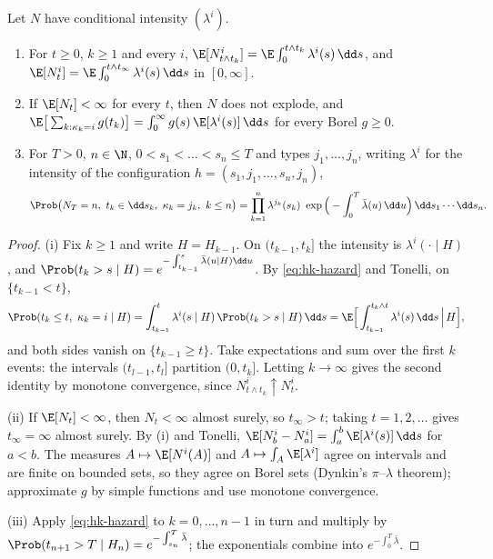 \begin{lemma}\label{lem:hk-compensator}
Let $N$ have conditional intensity $(\lambda^i)$.
\begin{enumerate}[label=(\roman*)]
  \item For $t\ge0$, $k\ge1$ and every $i$, $\E[N^i_{t\wedge t_k}]=\E\int_0^{t\wedge t_k}\lambda^i(s)\,\dd s$, and
    $\E[N^i_t]=\E\int_0^{t\wedge t_\infty}\lambda^i(s)\,\dd s$ in $[0,\infty]$.
  \item If $\E[N_t]<\infty$ for every $t$, then $N$ does not explode, and
    $\E\big[\sum_{k:\kappa_k=i}g(t_k)\big]=\int_0^\infty g(s)\,\E[\lambda^i(s)]\,\dd s$ for every Borel $g\ge0$.
  \item For $T>0$, $n\in\N$, $0<s_1<\dots<s_n\le T$ and types $j_1,\dots,j_n$, writing $\lambda^i$ for the
    intensity of the configuration $h=(s_1,j_1,\dots,s_n,j_n)$,
    \begin{equation}\label{eq:hk-density}
      \Prob\big(N_T=n,\ t_k\in\dd s_k,\ \kappa_k=j_k,\ k\le n\big)
      =\prod_{k=1}^n\lambda^{j_k}(s_k)\ \exp\Big(-\int_0^T\bar\lambda(u)\,\dd u\Big)\,\dd s_1\cdots\dd s_n .
    \end{equation}
\end{enumerate}
\end{lemma}

\begin{proof}
(i) Fix $k\ge1$ and write $H=H_{k-1}$. On $(t_{k-1},t_k]$ the intensity is $\lambda^i(\cdot\mid H)$, and
$\Prob(t_k>s\mid H)=e^{-\int_{t_{k-1}}^s\bar\lambda(u\mid H)\dd u}$. By \eqref{eq:hk-hazard} and Tonelli, on
$\{t_{k-1}<t\}$,
\[
  \Prob(t_k\le t,\ \kappa_k=i\mid H)=\int_{t_{k-1}}^t\lambda^i(s\mid H)\,\Prob(t_k>s\mid H)\,\dd s
  =\E\Big[\int_{t_{k-1}}^{t_k\wedge t}\lambda^i(s)\,\dd s\,\Big|\,H\Big],
\]
and both sides vanish on $\{t_{k-1}\ge t\}$. Take expectations and sum over the first $k$ events: the
intervals $(t_{l-1},t_l]$ partition $(0,t_k]$. Letting $k\to\infty$ gives the second identity by monotone
convergence, since $N^i_{t\wedge t_k}\uparrow N^i_t$.

(ii) If $\E[N_t]<\infty$, then $N_t<\infty$ almost surely, so $t_\infty>t$; taking $t=1,2,\dots$ gives
$t_\infty=\infty$ almost surely. By (i) and Tonelli, $\E[N^i_b-N^i_a]=\int_a^b\E[\lambda^i(s)]\,\dd s$ for $a<b$.
The measures $A\mapsto\E[N^i(A)]$ and $A\mapsto\int_A\E[\lambda^i]$ agree on intervals and are finite on
bounded sets, so they agree on Borel sets (Dynkin's $\pi$--$\lambda$ theorem); approximate $g$ by simple
functions and use monotone convergence.

(iii) Apply \eqref{eq:hk-hazard} to $k=0,\dots,n-1$ in turn and multiply by $\Prob(t_{n+1}>T\mid
H_n)=e^{-\int_{s_n}^T\bar\lambda}$; the exponentials combine into $e^{-\int_0^T\bar\lambda}$.
\end{proof}

